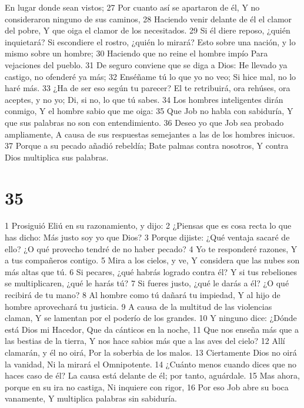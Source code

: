 En lugar donde sean vistos;  
27 Por cuanto así se apartaron de él,  
Y no consideraron ninguno de sus caminos,  
28 Haciendo venir delante de él el clamor del pobre,  
Y que oiga el clamor de los necesitados.  
29 Si él diere reposo, ¿quién inquietará?  
Si escondiere el rostro, ¿quién lo mirará?  
Esto sobre una nación, y lo mismo sobre un hombre;  
30 Haciendo que no reine el hombre impío  
Para vejaciones del pueblo.  
31 De seguro conviene que se diga a Dios:  
He llevado ya castigo, no ofenderé ya más;  
32 Enséñame tú lo que yo no veo;  
Si hice mal, no lo haré más.  
33 ¿Ha de ser eso según tu parecer?  
El te retribuirá, ora rehúses, ora aceptes, y no yo;  
Di, si no, lo que tú sabes.  
34 Los hombres inteligentes dirán conmigo,  
Y el hombre sabio que me oiga: 
35 Que Job no habla con sabiduría,  
Y que sus palabras no son con entendimiento.  
36 Deseo yo que Job sea probado ampliamente,  
A causa de sus respuestas semejantes a las de los hombres inicuos.  
37 Porque a su pecado añadió rebeldía;  
Bate palmas contra nosotros,  
Y contra Dios multiplica sus palabras.  

\chapter{35}


1 Prosiguió Eliú en su razonamiento, y dijo:  
2 ¿Piensas que es cosa recta lo que has dicho:  
Más justo soy yo que Dios?  
3 Porque dijiste: ¿Qué ventaja sacaré de ello?  
¿O qué provecho tendré de no haber pecado?  
4 Yo te responderé razones, 
Y a tus compañeros contigo.  
5 Mira a los cielos, y ve, 
Y considera que las nubes son más altas que tú. 
6 Si pecares, ¿qué habrás logrado contra él?  
Y si tus rebeliones se multiplicaren, ¿qué le harás tú?  
7 Si fueres justo, ¿qué le darás a él?  
¿O qué recibirá de tu mano?  
8 Al hombre como tú dañará tu impiedad,  
Y al hijo de hombre aprovechará tu justicia. 
9 A causa de la multitud de las violencias claman,  
Y se lamentan por el poderío de los grandes.  
10 Y ninguno dice: ¿Dónde está Dios mi Hacedor,  
Que da cánticos en la noche,  
11 Que nos enseña más que a las bestias de la tierra,  
Y nos hace sabios más que a las aves del cielo?  
12 Allí clamarán, y él no oirá,  
Por la soberbia de los malos.  
13 Ciertamente Dios no oirá la vanidad,  
Ni la mirará el Omnipotente.  
14 ¿Cuánto menos cuando dices que no haces caso de él?  
La causa está delante de él; por tanto, aguárdale.  
15 Mas ahora, porque en su ira no castiga,  
Ni inquiere con rigor,  
16 Por eso Job abre su boca vanamente,  
Y multiplica palabras sin sabiduría.  

